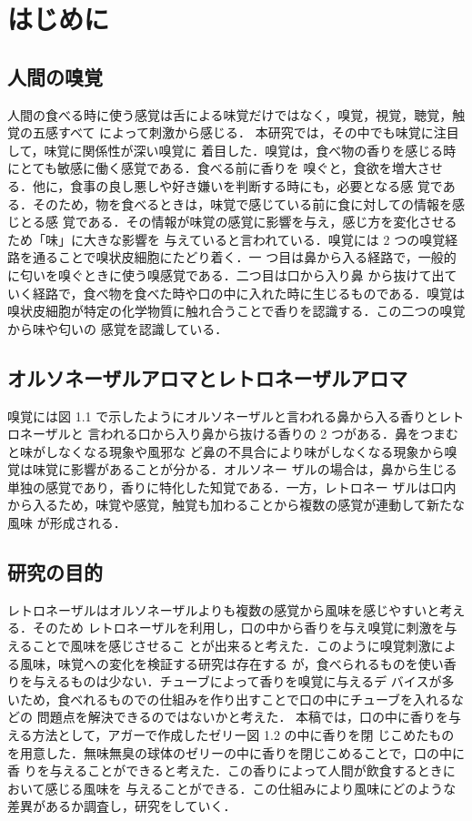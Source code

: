 \section{はじめに}
\subsection{人間の嗅覚}
\label{subsec:intro}
人間の食べる時に使う感覚は舌による味覚だけではなく，嗅覚，視覚，聴覚，触覚の五感すべて
によって刺激から感じる． 本研究では，その中でも味覚に注目して，味覚に関係性が深い嗅覚に
着目した．嗅覚は，食べ物の香りを感じる時にとても敏感に働く感覚である．食べる前に香りを
嗅ぐと，食欲を増大させる．他に，食事の良し悪しや好き嫌いを判断する時にも，必要となる感
覚である．そのため，物を食べるときは，味覚で感じている前に食に対しての情報を感じとる感
覚である．その情報が味覚の感覚に影響を与え，感じ方を変化させるため「味」に大きな影響を
与えていると言われている．嗅覚には 2 つの嗅覚経路を通ることで嗅状皮細胞にたどり着く．一
つ目は鼻から入る経路で，一般的に匂いを嗅ぐときに使う嗅感覚である．二つ目は口から入り鼻
から抜けて出ていく経路で，食べ物を食べた時や口の中に入れた時に生じるものである．嗅覚は
嗅状皮細胞が特定の化学物質に触れ合うことで香りを認識する．この二つの嗅覚から味や匂いの
感覚を認識している．


\subsection{オルソネーザルアロマとレトロネーザルアロマ}
嗅覚には図 1.1 で示したようにオルソネーザルと言われる鼻から入る香りとレトロネーザルと
言われる口から入り鼻から抜ける香りの 2 つがある．鼻をつまむと味がしなくなる現象や風邪な
ど鼻の不具合により味がしなくなる現象から嗅覚は味覚に影響があることが分かる．オルソネー
ザルの場合は，鼻から生じる単独の感覚であり，香りに特化した知覚である．一方，レトロネー
ザルは口内から入るため，味覚や感覚，触覚も加わることから複数の感覚が連動して新たな風味
が形成される．


\subsection{研究の目的}
レトロネーザルはオルソネーザルよりも複数の感覚から風味を感じやすいと考える．そのため
レトロネーザルを利用し，口の中から香りを与え嗅覚に刺激を与えることで風味を感じさせるこ
とが出来ると考えた．このように嗅覚刺激による風味，味覚への変化を検証する研究は存在する
が，食べられるものを使い香りを与えるものは少ない．チューブによって香りを嗅覚に与えるデ
バイスが多いため，食べれるものでの仕組みを作り出すことで口の中にチューブを入れるなどの
問題点を解決できるのではないかと考えた．
本稿では，口の中に香りを与える方法として，アガーで作成したゼリー図 1.2 の中に香りを閉
じこめたものを用意した．無味無臭の球体のゼリーの中に香りを閉じこめることで，口の中に香
りを与えることができると考えた．この香りによって人間が飲食するときにおいて感じる風味を
与えることができる．この仕組みにより風味にどのような差異があるか調査し，研究をしていく．